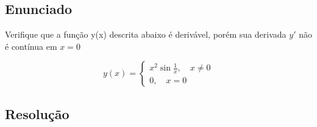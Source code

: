 


\subsection{Enunciado}

Verifique que a função y(x) descrita abaixo é derivável, porém sua derivada
$y'$ não é contínua em $x = 0$

\begin{equation*}
    y(x) =
    \begin{cases}
        x^2\sin{\frac{1}{x}}, \quad x \neq 0 \\
        0, \quad x = 0
    \end{cases}
\end{equation*}
\subsection{Resolução}